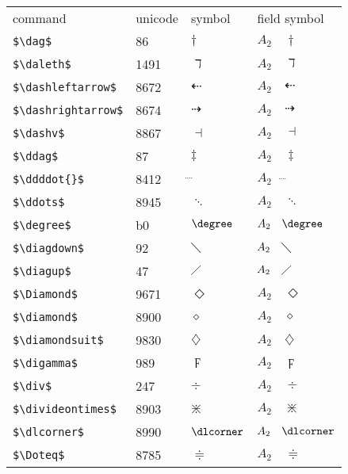 \documentclass{article}
\begin{document}
\begin{table}
\begin{center}
\begin{tabular}{llll}
 command                    &unicode & symbol                & field symbol\\
 \verb#$\dag$#                  & 86 & $\dag$                & $A_2\quad \dag$\\
 \verb#$\daleth$#             & 1491 & $\daleth$             & $A_2\quad \daleth$\\
 \verb#$\dashleftarrow$#      & 8672 & $\dashleftarrow$      & $A_2\quad \dashleftarrow$\\
 \verb#$\dashrightarrow$#     & 8674 & $\dashrightarrow$     & $A_2\quad \dashrightarrow$\\
 \verb#$\dashv$#              & 8867 & $\dashv$              & $A_2\quad \dashv$\\
 \verb#$\ddag$#                 & 87 & $\ddag$               & $A_2\quad \ddag$\\
 \verb#$\ddddot{}$#           & 8412 & $\ddddot{}$           & $A_2\quad \ddddot{}$\\
 \verb#$\ddots$#              & 8945 & $\ddots$              & $A_2\quad \ddots$\\
 \verb#$\degree$#               & b0 & $\degree$             & $A_2\quad \degree$\\
 \verb#$\diagdown$#             & 92 & $\diagdown$           & $A_2\quad \diagdown$\\
 \verb#$\diagup$#               & 47 & $\diagup$             & $A_2\quad \diagup$\\
 \verb#$\Diamond$#            & 9671 & $\Diamond$            & $A_2\quad \Diamond$\\
 \verb#$\diamond$#            & 8900 & $\diamond$            & $A_2\quad \diamond$\\
 \verb#$\diamondsuit$#        & 9830 & $\diamondsuit$        & $A_2\quad \diamondsuit$\\
 \verb#$\digamma$#             & 989 & $\digamma$            & $A_2\quad \digamma$\\
 \verb#$\div$#                 & 247 & $\div$                & $A_2\quad \div$\\
 \verb#$\divideontimes$#      & 8903 & $\divideontimes$      & $A_2\quad \divideontimes$\\
 \verb#$\dlcorner$#           & 8990 & $\dlcorner$           & $A_2\quad \dlcorner$\\
 \verb#$\Doteq$#              & 8785 & $\Doteq$              & $A_2\quad \Doteq$\\

\end{tabular}
\end{center}
\end{table}
\end{document}
